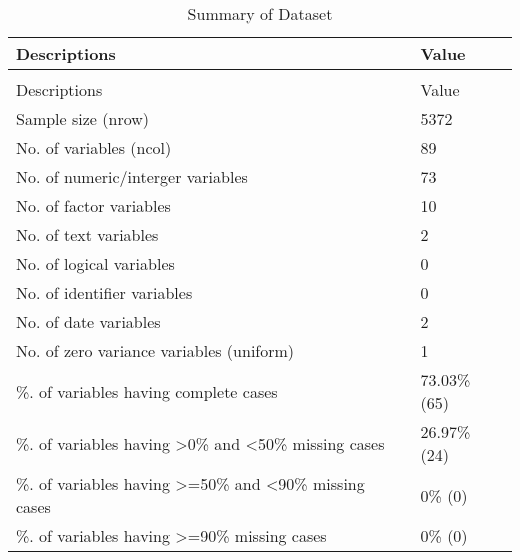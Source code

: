 \begingroup\fontsize{9}{11}\selectfont

\begin{longtable}[t]{ll}
\caption{Summary of Dataset}\\
\toprule
Descriptions & Value\\
\midrule
\endfirsthead
\caption[]{Summary of Dataset }\\
\toprule
Descriptions & Value\\
\midrule
\endhead

\endfoot
\bottomrule
\endlastfoot
Sample size (nrow) & 5372\\
No. of variables (ncol) & 89\\
No. of numeric/interger variables & 73\\
No. of factor variables & 10\\
No. of text variables & 2\\
No. of logical variables & 0\\
No. of identifier variables & 0\\
No. of date variables & 2\\
No. of zero variance variables (uniform) & 1\\
\%. of variables having complete cases & 73.03\% (65)\\
\%. of variables having >0\% and <50\% missing cases & 26.97\% (24)\\
\%. of variables having >=50\% and <90\% missing cases & 0\% (0)\\
\%. of variables having >=90\% missing cases & 0\% (0)\\*
\end{longtable}
\endgroup{}
